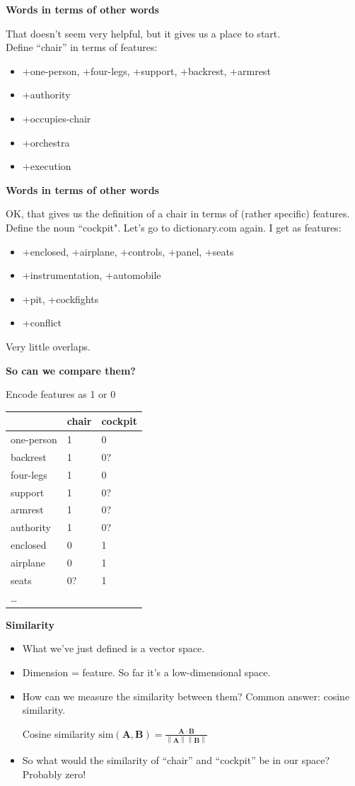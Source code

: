 \documentclass{beamer}
\newcommand{\norm}[1]{\left\lVert#1\right\rVert}
\newcommand{\pagestepalt}[2]{
  \begin{frame}[t]
    \begin{minipage}[t][0.26\textheight][t]{\textwidth}
      \begin{center}
        \huge
        \textbf{#1}
      \end{center}
    \end{minipage}
    
    \begin{minipage}[t][0.7\textheight][c]{\textwidth}
      #2
    \end{minipage}
  \end{frame}
}
\begin{document}
\pagestepalt{Words in terms of other words}{
  That doesn't seem very helpful, but it gives us a place to start.\\
  Define ``chair'' in terms of features:
  \begin{itemize}
  \item +one-person, +four-legs, +support, +backrest, +armrest
  \item +authority
  \item +occupies-chair
  \item +orchestra
  \item +execution
  \end{itemize}
}

\pagestepalt{Words in terms of other words}{
  OK, that gives us the definition of a chair in terms of (rather specific)
  features.\\
  Define the noun ``cockpit". Let's go to dictionary.com again.  I get as features:
  \begin{itemize}
  \item +enclosed, +airplane, +controls, +panel, +seats
  \item +instrumentation, +automobile
  \item +pit, +cockfights
  \item +conflict
  \end{itemize}
  Very little overlaps.
}

\pagestepalt{So can we compare them?}{
  Encode features as 1 or 0\\
  {\small
  \begin{tabular}{|l|l|l|}
    \hline
    & chair & cockpit \\
    \hline
    one-person & 1 & 0 \\
    backrest & 1 & 0? \\
    four-legs & 1 & 0 \\
    support & 1 & 0? \\
    armrest & 1 & 0? \\
    authority & 1 & 0?\\
    enclosed & 0 & 1\\
    airplane & 0 & 1 \\
    seats & 0? & 1 \\
    \ldots &&\\
    \hline
  \end{tabular}
  }
}

\pagestepalt{Similarity}{
  \begin{itemize}
  \item What we've just defined is a vector space.\pause
  \item Dimension = feature. So far it's a low-dimensional space.\pause
  \item How can we measure the similarity between them? Common answer:
    cosine similarity.\pause
    \begin{block}{Cosine similarity}
      $\mathrm{sim}(\mathbf{A}, \mathbf{B}) = \frac{\mathbf{A} \cdot \mathbf{B}}{\norm{\mathbf{A}}\norm{\mathbf{B}}}$
    \end{block}\pause
  \item So what would the similarity of ``chair'' and ``cockpit'' be in our space? Probably zero!
  \end{itemize}
}
\end{document}
